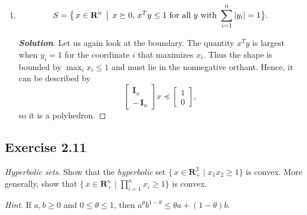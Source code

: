 \documentclass[12pt]{article}
\newenvironment{Solution}
  {\begin{proof}[\textbf{Solution}]}
  {\end{proof}}
\begin{document}
\begin{enumerate}[label=(\alph*)]
	      \begin{Solution}
		      The term \(x^T y\) is the dot product with a unit vector. Since \(x\) is chosen arbitrarily, we can set
		      \(\displaystyle y = \frac{x}{\|x\|_2}\)
		      to examine the boundary of the set, which gives
		      \[
			      \|x\|_2 \,\leq\, 1.
		      \]
		      Along with \(x \succeq 0\), this describes a portion of the \(n\)-dimensional sphere lying in the nonnegative orthant. Hence, it is not a polyhedron.
	      \end{Solution}

	\item
	      \[
		      S
		      =
		      \bigl\{\,
		      x \in \mathbf{R}^n
		      \,\bigm|\,
		      x \succeq 0,\,
		      x^T y \leq 1
		      \text{ for all }y\text{ with }
		      \sum_{i=1}^n |y_i| = 1
		      \bigr\}.
	      \]

	      \begin{Solution}
		      Let us again look at the boundary. The quantity \(x^T y\) is largest when \(y_i = 1\) for the coordinate \(i\) that maximizes \(x_i\). Thus the shape is bounded by
		      \(\max_i x_i \leq 1\)
		      and must lie in the nonnegative orthant.
		      Hence, it can be described by
		      \[
			      \begin{bmatrix}
				      \mathbf{I}_n \\
				      -\,\mathbf{I}_n
			      \end{bmatrix}
			      x
			      \preceq
			      \begin{bmatrix}
				      1 \\[3pt]
				      0
			      \end{bmatrix},
		      \]
		      so it is a polyhedron.
	      \end{Solution}

\end{enumerate}


\vspace{0.15in}

\subsection*{Exercise 2.11}
\textit{Hyperbolic sets}. Show that the \textit{hyperbolic} set
\(\{\, x \in \mathbf{R}^2_+ \mid x_1 x_2 \geq 1\}\)
is convex. More generally, show that
\(\{\, x \in \mathbf{R}^n_+ \mid \prod_{i=1}^n x_i \geq 1 \}\)
is convex.

\textit{Hint}. If \(a,b \geq 0\) and \(0 \leq \theta \leq 1\), then
\(a^{\theta} b^{1-\theta} \leq \theta a + (1 - \theta)b\).
\end{document}
